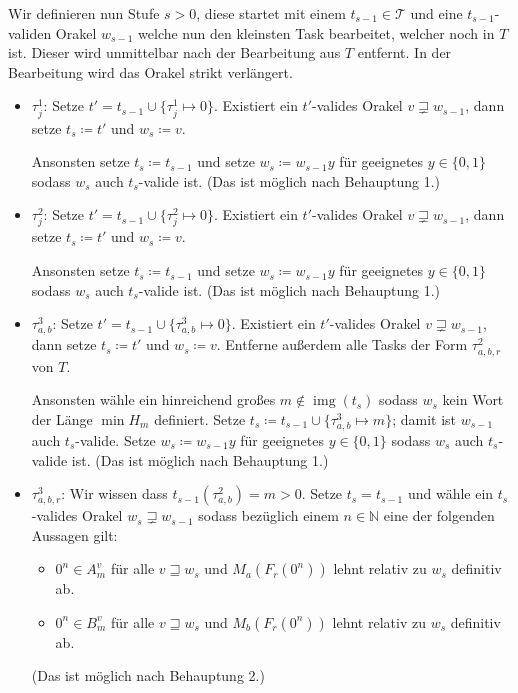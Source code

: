 \documentclass[nofonts]{uebung}
\DeclareMathOperator{\img}{img}
\begin{document}
Wir definieren nun Stufe $s>0$, diese startet mit einem $t_{s-1}\in\mathcal T$ und eine $t_{s-1}$-validen Orakel $w_{s-1}$ welche nun den kleinsten Task bearbeitet, welcher noch in $T$ ist. Dieser wird unmittelbar nach der Bearbeitung aus $T$ entfernt. In der Bearbeitung wird das Orakel strikt verlängert.
\begin{itemize}

    \item $\tau^1_j$: Setze $t'=t_{s-1}\cup\{\tau^1_j\mapsto 0\}$. Existiert ein $t'$-valides Orakel $v\sqsupsetneq w_{s-1}$, dann setze $t_s\coloneqq t'$ und $w_s\coloneqq v$.

        Ansonsten setze $t_s\coloneqq t_{s-1}$ und setze $w_s\coloneqq w_{s-1}y$ für geeignetes $y\in\{0,1\}$ sodass $w_s$ auch $t_s$-valide ist. (Das ist möglich nach Behauptung 1.)

    \item $\tau^2_j$: Setze $t'=t_{s-1}\cup\{\tau^2_j\mapsto 0\}$. Existiert ein $t'$-valides Orakel $v\sqsupsetneq w_{s-1}$, dann setze $t_s\coloneqq t'$ und $w_s\coloneqq v$.

        Ansonsten setze $t_s\coloneqq t_{s-1}$ und setze $w_s\coloneqq w_{s-1}y$ für geeignetes $y\in\{0,1\}$ sodass $w_s$ auch $t_s$-valide ist. (Das ist möglich nach Behauptung 1.)

    \item $\tau^3_{a,b}$: Setze $t'=t_{s-1}\cup\{\tau^3_{a,b}\mapsto 0\}$. Existiert ein $t'$-valides Orakel $v\sqsupsetneq w_{s-1}$, dann setze $t_s\coloneqq t'$ und $w_s\coloneqq v$. Entferne außerdem alle Tasks der Form $\tau^2_{a,b,r}$ von $T$.

        Ansonsten wähle ein hinreichend großes $m\not\in \img(t_s)$ sodass $w_s$ kein Wort der Länge $\min H_m$ definiert. Setze $t_s\coloneqq t_{s-1}\cup \{ \tau^3_{a,b}\mapsto m \}$; damit ist $w_{s-1}$ auch $t_s$-valide. Setze $w_s\coloneqq w_{s-1}y$ für geeignetes $y\in\{0,1\}$ sodass $w_s$ auch $t_s$-valide ist. (Das ist möglich nach Behauptung 1.)

    \item $\tau^3_{a,b,r}$: Wir wissen dass $t_{s-1}(\tau^2_{a,b})=m>0$. Setze $t_s=t_{s-1}$ und wähle ein $t_s$-valides Orakel $w_s\sqsupsetneq w_{s-1}$ sodass bezüglich einem $n\in\mathbb N$ eine der folgenden Aussagen gilt:
        \begin{itemize}[nosep,endpenalty=10000]
            \item $0^n\in A_m^v$ für alle $v\sqsupseteq w_s$ und $M_a(F_r(0^n))$ lehnt relativ zu $w_s$ definitiv ab.
            \item $0^n\in B_m^v$ für alle $v\sqsupseteq w_s$ und $M_b(F_r(0^n))$ lehnt relativ zu $w_s$ definitiv ab.
        \end{itemize} (Das ist möglich nach Behauptung 2.)
\end{itemize}
\end{document}
